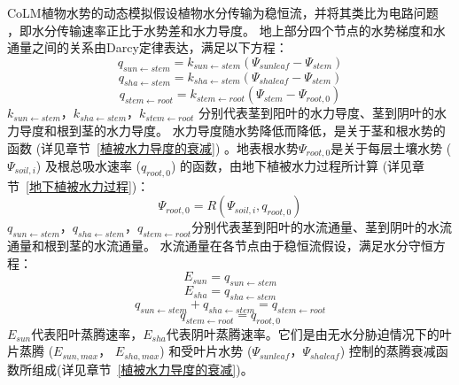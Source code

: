 CoLM植物水势的动态模拟假设植物水分传输为稳恒流，并将其类比为电路问题~
\citep{van1948water}，即水分传输速率正比于水势差和水力导度。
地上部分四个节点的水势梯度和水通量之间的关系由Darcy定律表达，满足以下方程：
\begin{equation}\label{q_sunstem}
q_{ {sun \leftarrow stem }}=k_{{sun} \leftarrow  {stem}}\left(\Psi_{sunleaf}-\Psi_{stem}\right)
\end{equation}
\begin{equation}
q_{ {sha \leftarrow stem }}=k_{ {sha} \leftarrow {stem}}\left(\Psi_{shaleaf}-\Psi_{ {stem }}\right)
\end{equation}
\begin{equation}
q_{ {stem \leftarrow root }}=k_{ {stem } \leftarrow  { root }}\left(\Psi_{ {stem }}-\Psi_{ {root }, 0}\right)
\end{equation}
$k_{sun \leftarrow stem}$，$k_{sha \leftarrow stem }$，$k_{stem \leftarrow root }$ 分别代表茎到阳叶的水力导度、茎到阴叶的水力导度和根到茎的水力导度。
水力导度随水势降低而降低，是关于茎和根水势的函数 (详见章节~\ref{植被水力导度的衰减}) 。地表根水势$\Psi_{root,0}$是关于每层土壤水势 ($\Psi_{soil,i}$) 
及根总吸水速率 ($q_{root,0}$) 的函数，由地下植被水力过程所计算 (详见章节~\ref{地下植被水力过程})：
\begin{equation}\label{Psi_root_0}
\Psi_{root, 0}=R\left(\Psi_{ {soil }, i}, q_{root, 0}\right)
\end{equation}
$q_{sun \leftarrow stem}$，$q_{sha \leftarrow stem }$，$q_{stem \leftarrow root }$分别代表茎到阳叶的水流通量、茎到阴叶的水流通量和根到茎的水流通量。
水流通量在各节点由于稳恒流假设，满足水分守恒方程：
\begin{equation}
E_{sun}=q_{sun \leftarrow  stem}
\end{equation}
\begin{equation}
E_{ {sha }}=q_{ sha \leftarrow stem}
\end{equation}
\begin{equation}
q_{ {sun \leftarrow stem }}+q_{ {sha \leftarrow stem }}=q_{ {stem \leftarrow root }}
\end{equation}
\begin{equation}\label{q_stemroot}
q_{stem \leftarrow root}=q_{root, 0}
\end{equation}
$E_{sun}$代表阳叶蒸腾速率，$E_{sha}$代表阴叶蒸腾速率。它们是由无水分胁迫情况下的叶片蒸腾 ($E_{sun,max}$， $E_{sha,max}$) 
和受叶片水势 ($\Psi_{sunleaf}$，$\Psi_{shaleaf}$) 控制的蒸腾衰减函数所组成(详见章节~\ref{植被水力导度的衰减})。


